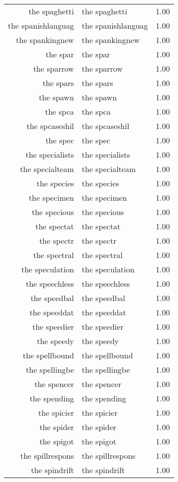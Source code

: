\begin{table}[ht]
\begin{tabular}{rlr}
  the spaghetti & the spaghetti & 1.00 \\ 
  the spanishlanguag & the spanishlanguag & 1.00 \\ 
  the spankingnew & the spankingnew & 1.00 \\ 
  the spar & the spar & 1.00 \\ 
  the sparrow & the sparrow & 1.00 \\ 
  the spars & the spars & 1.00 \\ 
  the spawn & the spawn & 1.00 \\ 
  the spca & the spca & 1.00 \\ 
  the spcaseshil & the spcaseshil & 1.00 \\ 
  the spec & the spec & 1.00 \\ 
  the specialists & the specialists & 1.00 \\ 
  the specialteam & the specialteam & 1.00 \\ 
  the species & the species & 1.00 \\ 
  the specimen & the specimen & 1.00 \\ 
  the specious & the specious & 1.00 \\ 
  the spectat & the spectat & 1.00 \\ 
  the spectr & the spectr & 1.00 \\ 
  the spectral & the spectral & 1.00 \\ 
  the speculation & the speculation & 1.00 \\ 
  the speechless & the speechless & 1.00 \\ 
  the speedbal & the speedbal & 1.00 \\ 
  the speeddat & the speeddat & 1.00 \\ 
  the speedier & the speedier & 1.00 \\ 
  the speedy & the speedy & 1.00 \\ 
  the spellbound & the spellbound & 1.00 \\ 
  the spellingbe & the spellingbe & 1.00 \\ 
  the spencer & the spencer & 1.00 \\ 
  the spending & the spending & 1.00 \\ 
  the spicier & the spicier & 1.00 \\ 
  the spider & the spider & 1.00 \\ 
  the spigot & the spigot & 1.00 \\ 
  the spillrespons & the spillrespons & 1.00 \\ 
  the spindrift & the spindrift & 1.00 \\ 

\end{tabular}
\end{table}
